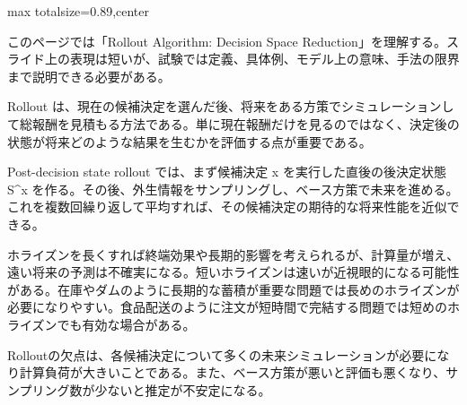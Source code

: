 \begin{minipage}[t]{0.58\textwidth}
\begin{adjustbox}{max totalsize={\textwidth}{0.89\textheight},center}
\begin{minipage}{\textwidth}\scriptsize
{}このページでは「Rollout Algorithm: Decision Space Reduction」を理解する。スライド上の表現は短いが、試験では定義、具体例、モデル上の意味、手法の限界まで説明できる必要がある。\par
Rollout は、現在の候補決定を選んだ後、将来をある方策でシミュレーションして総報酬を見積もる方法である。単に現在報酬だけを見るのではなく、決定後の状態が将来どのような結果を生むかを評価する点が重要である。\par
Post-decision state rollout では、まず候補決定 x を実行した直後の後決定状態 S\textasciicircum{}x を作る。その後、外生情報をサンプリングし、ベース方策で未来を進める。これを複数回繰り返して平均すれば、その候補決定の期待的な将来性能を近似できる。\par
ホライズンを長くすれば終端効果や長期的影響を考えられるが、計算量が増え、遠い将来の予測は不確実になる。短いホライズンは速いが近視眼的になる可能性がある。在庫やダムのように長期的な蓄積が重要な問題では長めのホライズンが必要になりやすい。食品配送のように注文が短時間で完結する問題では短めのホライズンでも有効な場合がある。\par
Rolloutの欠点は、各候補決定について多くの未来シミュレーションが必要になり計算負荷が大きいことである。また、ベース方策が悪いと評価も悪くなり、サンプリング数が少ないと推定が不安定になる。\par

\end{minipage}
\end{adjustbox}
\end{minipage}
